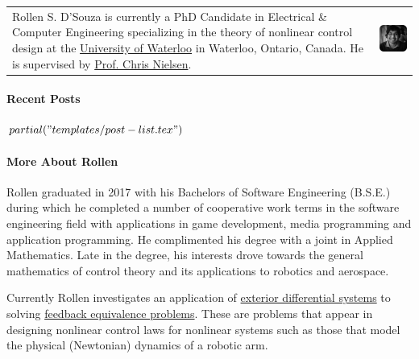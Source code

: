 \begin{tabular}{l|c}
Rollen S. D'Souza is currently a PhD Candidate in Electrical \& Computer Engineering specializing in the theory of nonlinear control design at the \href{https://uwaterloo.ca/}{University of Waterloo} in Waterloo, Ontario, Canada.
He is supervised by \href{https://ece.uwaterloo.ca/~cnielsen/}{Prof. Chris Nielsen}.
&
\includegraphics{images/rollen-128.png}
\end{tabular}
\paragraph{Recent Posts}
\begin{itemize}
  $partial("templates/post-list.tex")$
\end{itemize}

\paragraph{More About Rollen}
Rollen graduated in 2017 with his Bachelors of Software Engineering (B.S.E.) during which he completed a number of cooperative work terms in the software engineering field with applications in game development, media programming and application programming.
He complimented his degree with a joint in Applied Mathematics.
Late in the degree, his interests drove towards the general mathematics of control theory and its applications to robotics and aerospace.

Currently Rollen investigates an application of \href{https://en.wikipedia.org/wiki/Differential_ideal}{exterior differential systems} to solving \href{https://en.wikipedia.org/wiki/Feedback_linearization}{feedback equivalence problems}.
These are problems that appear in designing nonlinear control laws for nonlinear systems such as those that model the physical (Newtonian) dynamics of a robotic arm.
